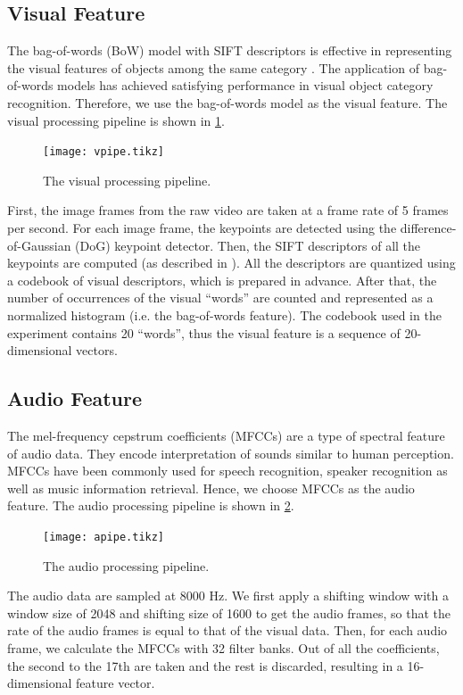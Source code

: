 \documentclass[letterpaper, 10 pt, conference]{ieeeconf}
\begin{document}
\subsection{Visual Feature}
The bag-of-words (BoW) model with SIFT descriptors is effective in representing the visual features of objects among the same category \cite{csurka_visual_2004,sivic_discovering_2005}. The application of bag-of-words models has achieved satisfying performance in visual object category recognition. Therefore, we use the bag-of-words model as the visual feature. The visual processing pipeline is shown in \cref{fig:vpipe}.

\begin{figure}[t]
  \footnotesize
  \centering
  \texttt{[image: vpipe.tikz]}
  \caption{The visual processing pipeline.}
  \label{fig:vpipe}
\end{figure}

First, the image frames from the raw video are taken at a  frame rate of 5 frames per second. For each image frame, the keypoints are detected using the difference-of-Gaussian (DoG) keypoint detector. Then, the SIFT descriptors of all the keypoints are computed (as described in \cite{lowe_distinctive_2004}). All the descriptors are quantized using a codebook of visual descriptors, which is prepared in advance. After that, the number of occurrences of the visual ``words'' are counted and represented as a normalized histogram (i.e. the bag-of-words feature). The codebook used in the experiment contains 20 ``words'', thus the visual feature is a sequence of 20-dimensional vectors.

\subsection{Audio Feature}
The mel-frequency cepstrum coefficients (MFCCs) are a type of spectral feature of audio data. They encode interpretation of sounds similar to human perception. MFCCs have been commonly used for speech recognition, speaker recognition as well as music information retrieval. Hence, we choose MFCCs as the audio feature. The audio processing pipeline is shown in \cref{fig:apipe}.

\begin{figure}[t]
  \footnotesize
  \centering
  \texttt{[image: apipe.tikz]}
  \caption{The audio processing pipeline.}
  \label{fig:apipe}
\end{figure}

The audio data are sampled at 8000 Hz. We first apply a shifting window with a window size of 2048 and shifting size of 1600 to get the audio frames, so that the rate of the audio frames is equal to that of the visual data. Then, for each audio frame, we calculate the MFCCs with 32 filter banks. Out of all the coefficients, the second to the 17th are taken and the rest is discarded, resulting in a 16-dimensional feature vector.
\end{document}
